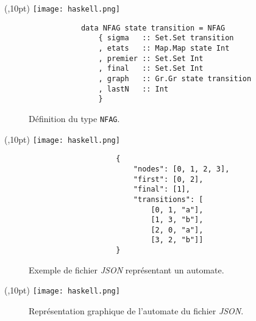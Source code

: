 \documentclass[aspectratio=169,xcolor=dvipsnames]{beamer}
\begin{document}

\begin{frame}[fragile]
    \begin{textblock*}{20pt}(\textwidth-50pt,10pt)
        \texttt{[image: haskell.png]}
    \end{textblock*}
    \begin{figure}
        \begin{verbatim}
            data NFAG state transition = NFAG
                { sigma   :: Set.Set transition
                , etats   :: Map.Map state Int
                , premier :: Set.Set Int
                , final   :: Set.Set Int
                , graph   :: Gr.Gr state transition
                , lastN   :: Int
                }
        \end{verbatim}
        \caption{Définition du type \texttt{NFAG}.}
    \end{figure}
\end{frame}


\begin{frame}[fragile]
    \begin{textblock*}{20pt}(\textwidth-50pt,10pt)
        \texttt{[image: haskell.png]}
    \end{textblock*}
    \begin{figure}
        \begin{verbatim}
                    {
                        "nodes": [0, 1, 2, 3],
                        "first": [0, 2],
                        "final": [1],
                        "transitions": [
                            [0, 1, "a"], 
                            [1, 3, "b"], 
                            [2, 0, "a"], 
                            [3, 2, "b"]] 
                    }
        \end{verbatim}
        \caption{Exemple de fichier \textit{JSON} représentant un automate.}
    \end{figure}
\end{frame}


\begin{frame}
    \begin{textblock*}{20pt}(\textwidth-50pt,10pt)
        \texttt{[image: haskell.png]}
    \end{textblock*}
    \begin{figure}
        
        \caption{
            Représentation graphique de l'automate du fichier \textit{JSON}.
        }
    \end{figure}
\end{frame}
\end{document}
